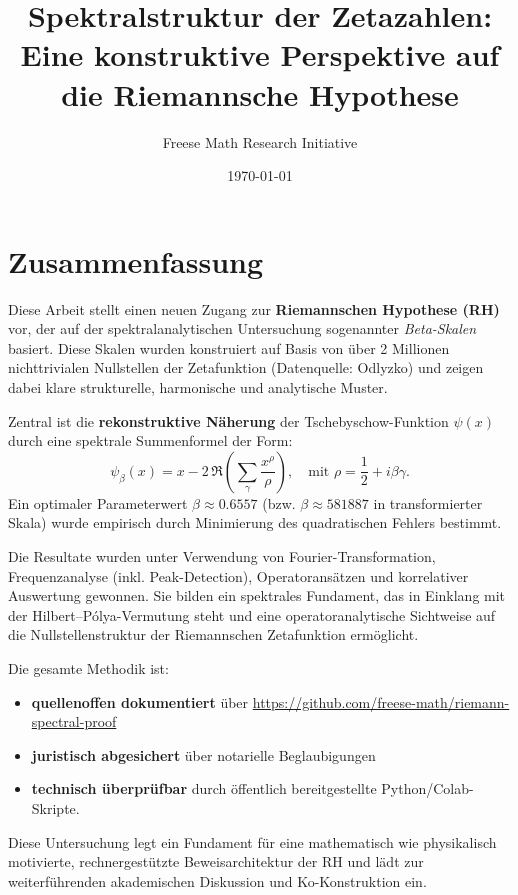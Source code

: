 \documentclass[12pt]{article}
\title{Spektralstruktur der Zetazahlen: \\ Eine konstruktive Perspektive auf die Riemannsche Hypothese}
\author{Freese Math Research Initiative}
\date{\today}
\begin{document}
\maketitle

\section*{Zusammenfassung}

Diese Arbeit stellt einen neuen Zugang zur \textbf{Riemannschen Hypothese (RH)} vor, der auf der spektralanalytischen Untersuchung sogenannter \emph{Beta-Skalen} basiert. Diese Skalen wurden konstruiert auf Basis von über 2 Millionen nichttrivialen Nullstellen der Zetafunktion (Datenquelle: Odlyzko) und zeigen dabei klare strukturelle, harmonische und analytische Muster.

Zentral ist die \textbf{rekonstruktive Näherung} der Tschebyschow-Funktion $\psi(x)$ durch eine spektrale Summenformel der Form:
\[
\psi_\beta(x) = x - 2 \, \Re \left( \sum_{\gamma} \frac{x^{\rho}}{\rho} \right), \quad \text{mit } \rho = \frac{1}{2} + i\beta\gamma.
\]
Ein optimaler Parameterwert $\beta \approx 0.6557$ (bzw. $\beta \approx 581887$ in transformierter Skala) wurde empirisch durch Minimierung des quadratischen Fehlers bestimmt.

Die Resultate wurden unter Verwendung von Fourier-Transformation, Frequenzanalyse (inkl. Peak-Detection), Operatoransätzen und korrelativer Auswertung gewonnen. Sie bilden ein spektrales Fundament, das in Einklang mit der Hilbert--Pólya-Vermutung steht und eine operatoranalytische Sichtweise auf die Nullstellenstruktur der Riemannschen Zetafunktion ermöglicht.

Die gesamte Methodik ist:
\begin{itemize}
    \item \textbf{quellenoffen dokumentiert} über \url{https://github.com/freese-math/riemann-spectral-proof}
    \item \textbf{juristisch abgesichert} über notarielle Beglaubigungen
    \item \textbf{technisch überprüfbar} durch öffentlich bereitgestellte Python/Colab-Skripte.
\end{itemize}

Diese Untersuchung legt ein Fundament für eine mathematisch wie physikalisch motivierte, rechnergestützte Beweisarchitektur der RH und lädt zur weiterführenden akademischen Diskussion und Ko-Konstruktion ein.
\end{document}
